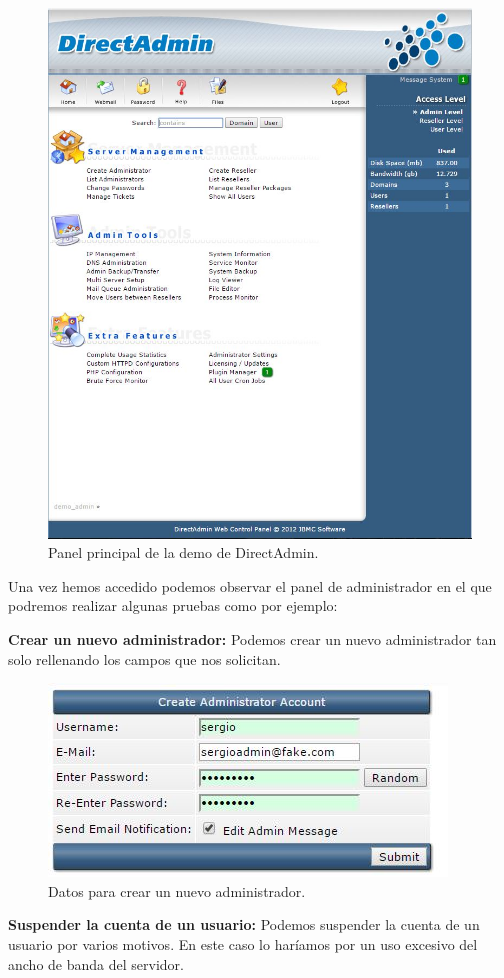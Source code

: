 \begin{figure}[H]
	\centering
	\includegraphics[scale=0.75]{direct-admin1.jpg}
	\caption{Panel principal de la demo de DirectAdmin. \label{fig:figura6}}
\end{figure}

Una vez hemos accedido podemos observar el panel de administrador en el que podremos realizar algunas pruebas como por ejemplo:\newline

\vspace{9mm}
\textbf{Crear un nuevo administrador:} Podemos crear un nuevo administrador tan solo rellenando los campos que nos solicitan.

\begin{figure}[H]
	\centering
	\includegraphics[scale=0.75]{create-admin.jpg}
	\caption{Datos para crear un nuevo administrador. \label{fig:figura7}}
\end{figure}
\vspace{9mm}
\textbf{Suspender la cuenta de un usuario:} Podemos suspender la cuenta de un usuario por varios motivos. En este caso lo haríamos por un uso excesivo del ancho de banda del servidor.

